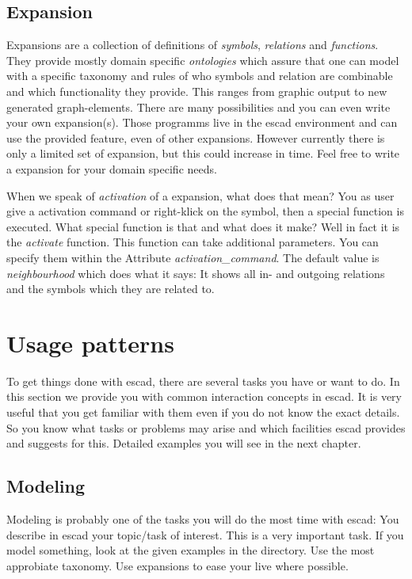 \documentclass[a4paper, 12pt, openany]{scrbook}
\begin{document}
\subsection{Expansion}
Expansions are a collection of definitions of \emph{symbols}, \emph{relations} and \emph{functions}. They provide mostly domain specific \emph{ontologies} which assure that one can model with a specific taxonomy and rules of who symbols and relation are combinable and which functionality they provide. This ranges from graphic output to new generated graph-elements. There are many possibilities and you can even write your own expansion(s). Those programms live in the escad environment and can use the provided feature, even of other expansions. However currently there is only a limited set of expansion, but this could increase in time. Feel free to write a expansion for your domain specific needs.

When we speak of \emph{activation} of a expansion, what does that mean? You as user give a activation command or right-klick on the symbol, then a special function is executed. What special function is that and what does it make? Well in fact it is the \emph{activate} function. This function can take additional parameters. You can specify them within the Attribute \emph{activation\_command}. The default value is \emph{neighbourhood} which does what it says: It shows all in- and outgoing relations and the symbols which they are related to.
\section{Usage patterns}
To get things done with escad, there are several tasks you have or want to do. In this section we provide you with common interaction concepts in escad. It is very useful that you get familiar with them even if you do not know the exact details. So you know what tasks or problems may arise and which facilities escad provides and suggests for this. Detailed examples you will see in the next chapter.
\subsection{Modeling}
Modeling is probably one of the tasks you will do the most time with escad: You describe in escad your topic/task of interest. This is a very important task. If you model something, look at the given examples in the  directory. Use the most approbiate taxonomy. Use expansions to ease your live where possible.
\end{document}
